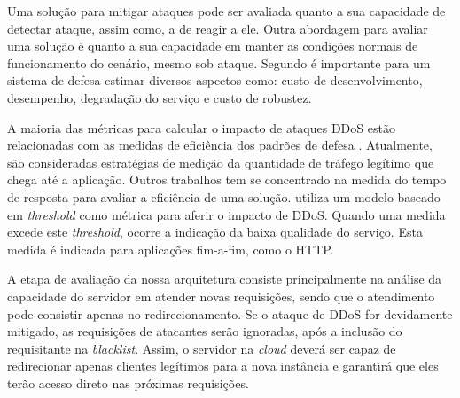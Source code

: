 

Uma solução para mitigar ataques pode ser avaliada quanto a sua capacidade de detectar ataque, assim como, a de reagir a ele. Outra abordagem para avaliar uma solução é quanto a sua capacidade em manter as condições normais de funcionamento do cenário, mesmo sob ataque. Segundo \cite{4600003} é importante para um sistema de defesa estimar diversos aspectos como: custo de desenvolvimento, desempenho, degradação do serviço e custo de robustez. 

A maioria das métricas para calcular o impacto de ataques DDoS estão relacionadas com as medidas de eficiência dos padrões de defesa \cite{4809152}. Atualmente, são consideradas estratégias de medição da quantidade de tráfego legítimo que chega até a aplicação. Outros trabalhos tem se concentrado na medida do tempo de resposta para avaliar a eficiência de uma solução. \cite{Mirkovic:2007:TUM:1281700.1281708} utiliza um modelo baseado em \emph{threshold} como métrica para aferir o impacto de DDoS. Quando uma medida excede este \emph{threshold}, ocorre a  indicação da baixa qualidade do serviço. Esta medida é indicada para aplicações fim-a-fim, como o HTTP.

A etapa de avaliação da nossa arquitetura consiste principalmente na análise
da capacidade do servidor em atender novas requisições, sendo que o atendimento pode consistir apenas no redirecionamento. 
Se o ataque de DDoS for devidamente
mitigado, as requisições de atacantes serão ignoradas, após a inclusão do requisitante na \emph{blacklist}. Assim, o servidor na \emph{cloud} deverá ser capaz de redirecionar apenas clientes legítimos 
para a nova instância e garantirá que eles terão acesso direto nas próximas requisições. 
%
%



